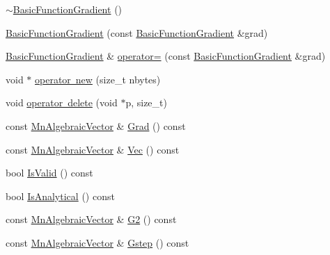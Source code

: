 \begin{DoxyCompactItemize}
\item 
\mbox{\hyperlink{classROOT_1_1Minuit2_1_1BasicFunctionGradient_a55ce8afeb4e559cf2d2c88aca167b524}{$\sim$\+Basic\+Function\+Gradient}} ()
\item 
\mbox{\hyperlink{classROOT_1_1Minuit2_1_1BasicFunctionGradient_a1193087c872c26bca560f069f2efc353}{Basic\+Function\+Gradient}} (const \mbox{\hyperlink{classROOT_1_1Minuit2_1_1BasicFunctionGradient}{Basic\+Function\+Gradient}} \&grad)
\item 
\mbox{\hyperlink{classROOT_1_1Minuit2_1_1BasicFunctionGradient}{Basic\+Function\+Gradient}} \& \mbox{\hyperlink{classROOT_1_1Minuit2_1_1BasicFunctionGradient_a1bf2f76bab802466b8697136fbea33e4}{operator=}} (const \mbox{\hyperlink{classROOT_1_1Minuit2_1_1BasicFunctionGradient}{Basic\+Function\+Gradient}} \&grad)
\item 
void $\ast$ \mbox{\hyperlink{classROOT_1_1Minuit2_1_1BasicFunctionGradient_a2b08ebb0074a43cfca91f74991c660d5}{operator new}} (size\+\_\+t nbytes)
\item 
void \mbox{\hyperlink{classROOT_1_1Minuit2_1_1BasicFunctionGradient_acc4585a778dae54497b4c4342a4dcd1e}{operator delete}} (void $\ast$p, size\+\_\+t)
\item 
const \mbox{\hyperlink{namespaceROOT_1_1Minuit2_a62ed97730a1ca8d3fbaec64a19aa11c9}{Mn\+Algebraic\+Vector}} \& \mbox{\hyperlink{classROOT_1_1Minuit2_1_1BasicFunctionGradient_a724c9b5e8c9cf8646eb362017158f52d}{Grad}} () const
\item 
const \mbox{\hyperlink{namespaceROOT_1_1Minuit2_a62ed97730a1ca8d3fbaec64a19aa11c9}{Mn\+Algebraic\+Vector}} \& \mbox{\hyperlink{classROOT_1_1Minuit2_1_1BasicFunctionGradient_a4c0d60175db412ac03313f824a055886}{Vec}} () const
\item 
bool \mbox{\hyperlink{classROOT_1_1Minuit2_1_1BasicFunctionGradient_a53963689701d2b3477e176920efdd3f9}{Is\+Valid}} () const
\item 
bool \mbox{\hyperlink{classROOT_1_1Minuit2_1_1BasicFunctionGradient_a6e4d212f4a441b9b58c6886b2c4c50ce}{Is\+Analytical}} () const
\item 
const \mbox{\hyperlink{namespaceROOT_1_1Minuit2_a62ed97730a1ca8d3fbaec64a19aa11c9}{Mn\+Algebraic\+Vector}} \& \mbox{\hyperlink{classROOT_1_1Minuit2_1_1BasicFunctionGradient_a7d06765b80da1a8baa4af474b503ec6c}{G2}} () const
\item 
const \mbox{\hyperlink{namespaceROOT_1_1Minuit2_a62ed97730a1ca8d3fbaec64a19aa11c9}{Mn\+Algebraic\+Vector}} \& \mbox{\hyperlink{classROOT_1_1Minuit2_1_1BasicFunctionGradient_a32966146618c6e1435f76dd851e7c014}{Gstep}} () const
\end{DoxyCompactItemize}


